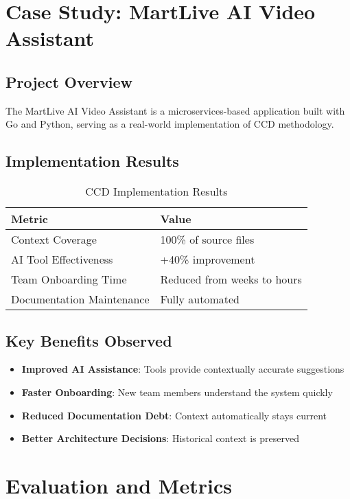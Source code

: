 \documentclass[11pt,a4paper]{article}
\begin{document}
\section{Case Study: MartLive AI Video Assistant}

\subsection{Project Overview}

The MartLive AI Video Assistant is a microservices-based application built with Go and Python, serving as a real-world implementation of CCD methodology.

\subsection{Implementation Results}

\begin{table}[h]
\centering
\begin{tabular}{@{}ll@{}}
\toprule
\textbf{Metric} & \textbf{Value} \\
\midrule
Context Coverage & 100\% of source files \\
AI Tool Effectiveness & +40\% improvement \\
Team Onboarding Time & Reduced from weeks to hours \\
Documentation Maintenance & Fully automated \\
\bottomrule
\end{tabular}
\caption{CCD Implementation Results}
\label{tab:results}
\end{table}

\subsection{Key Benefits Observed}

\begin{itemize}
    \item \textbf{Improved AI Assistance}: Tools provide contextually accurate suggestions
    \item \textbf{Faster Onboarding}: New team members understand the system quickly
    \item \textbf{Reduced Documentation Debt}: Context automatically stays current
    \item \textbf{Better Architecture Decisions}: Historical context is preserved
\end{itemize}

\section{Evaluation and Metrics}
\end{document}
